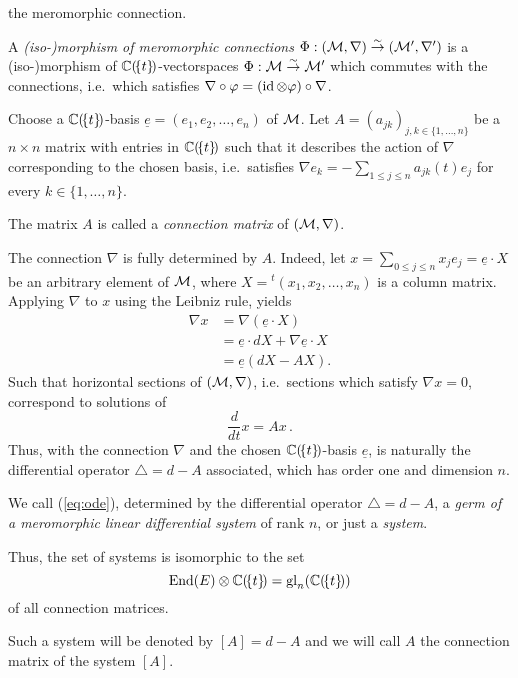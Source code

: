 the meromorphic connection.
\begin{defn}
  A \emph{(iso-)morphism of meromorphic connections}
  $\Phi:(\mathcal{M},\nabla)\overset{\sim}\to(\mathcal{M}',\nabla')$ is a (iso-)morphism of
  $\mathbb{C}(\!\{t\}\!)$-vectorspaces $\Phi:\mathcal{M}\overset{\sim}\to\mathcal{M}'$ which commutes
  with the connections, i.e.\ which satisfies
  $\nabla\circ\varphi = (\operatorname{id}\otimes\varphi)\circ\nabla$.
\end{defn}
Choose a $\mathbb{C}(\!\{t\}\!)$-basis $\underline{e}=(e_1,e_2,\dots,e_n)$ of $\mathcal{M}$.
Let $A=(a_{jk})_{j,k\in\{1,\dots,n\}}$ be a $n\times n$ matrix with entries in
$\mathbb{C}(\!\{t\}\!)$ such that it describes the action of $\nabla$ corresponding
to the chosen basis, i.e.\ satisfies
 $\nabla e_k=-\sum_{1\leq j\leq n} a_{jk}(t)e_j$ for every $k\in\{1,\dots,n\}$.
\begin{defn}
  The matrix $A$ is called a \emph{connection matrix} of $(\mathcal{M},\nabla)$.
\end{defn}
The connection $\nabla$ is fully determined by $A$. Indeed, let
$x=\sum_{0\leq j\leq n}x_je_j=\underline{e}\cdot X$ be an arbitrary element of
$\mathcal{M}$, where $X={}^t\!(x_1,x_2 ,\dots,x_n)$ is a column matrix.
Applying $\nabla$ to $x$ using the Leibniz rule, yields
\begin{align*}
  \nabla x&=\nabla\left(\underline{e}\cdot X\right)
  \\&=\underline{e} \cdot dX + \nabla \underline{e} \cdot X
  \\&=\underline{e}\left(dX-AX\right).
\end{align*}
Such that horizontal sections of $(\mathcal{M},\nabla)$, i.e.\ sections which satisfy
$\nabla x=0$, correspond to solutions of
\begin{equation}\label{eq:ode}
  \frac{d}{dt}x=Ax \,.
\end{equation}
Thus, with the connection $\nabla$ and the chosen $\mathbb{C}(\!\{t\}\!)$-basis
$\underline{e}$, is naturally the differential operator
$\triangle=d-A$ associated, which has order one and dimension $n$.
\begin{defn}
  We call (\ref{eq:ode}), determined by the differential operator
  $\triangle=d-A$, a \emph{germ of a meromorphic linear differential
  system\footnotemark} of rank $n$, or just a
  \emph{system}.
  \begin{s-prop}
    Thus, the set of systems is isomorphic to the set
    \[
      \operatorname{End}(E)\otimes\mathbb{C}(\!\{t\}\!)=\operatorname{gl}_n(\mathbb{C}(\!\{t\}\!))
    \]
    of all connection matrices.
  \end{s-prop}
  Such a system will be denoted by $[A]=d-A$ and we will call $A$ the
  connection matrix of the system $[A]$.
\end{defn}


